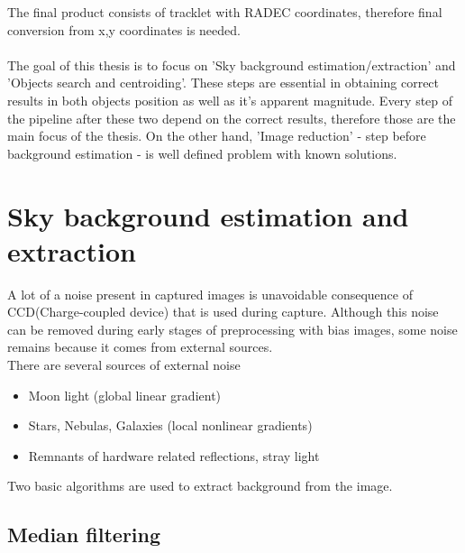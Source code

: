 \documentclass[12pt, a4paper, oneside]{book}
\begin{document}
\indent
The final product consists of tracklet with RADEC coordinates, therefore final conversion from x,y coordinates is needed.\\
\\
The goal of this thesis is to focus on 'Sky background estimation/extraction' and 'Objects search and centroiding'.
These steps are essential in obtaining correct results in both objects position as well as it's apparent magnitude.
Every step of the pipeline after these two depend on the correct results, therefore those are the main focus of the thesis.
On the other hand, 'Image reduction' - step before background estimation - is well defined problem with known solutions.

\chapter{Sky background estimation and extraction}
A lot of a noise present in captured images is unavoidable consequence of CCD(Charge-coupled device) that is used during capture. Although this noise can be removed during early stages of preprocessing with bias images, some noise remains because it comes from external sources.\\
There are several sources of external noise
\begin{itemize}
    \item{Moon light (global linear gradient)}
    \item{Stars, Nebulas, Galaxies (local nonlinear gradients)}
    \item{Remnants of hardware related reflections, stray light}
\end{itemize}
Two basic algorithms are used to extract background from the image.

\section{Median filtering}
\end{document}
